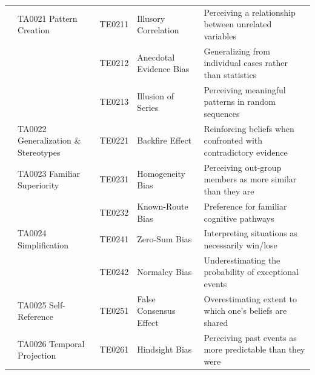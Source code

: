 \documentclass[11pt,a4paper]{article}
\begin{document}
\begin{small}
\begin{longtable}{C{1.2cm}L{3.2cm}C{1.2cm}L{3cm}L{5.5cm}}
\midrule

 & TA0021 Pattern Creation & TE0211 & Illusory Correlation & Perceiving a relationship between unrelated variables \\
 & & TE0212 & Anecdotal Evidence Bias & Generalizing from individual cases rather than statistics \\
 & & TE0213 & Illusion of Series & Perceiving meaningful patterns in random sequences \\
\cmidrule(l){2-5}
 & TA0022 Generalization \& Stereotypes & TE0221 & Backfire Effect & Reinforcing beliefs when confronted with contradictory evidence \\
\cmidrule(l){2-5}
 & TA0023 Familiar Superiority & TE0231 & Homogeneity Bias & Perceiving out-group members as more similar than they are \\
 & & TE0232 & Known-Route Bias & Preference for familiar cognitive pathways \\
\cmidrule(l){2-5}
 & TA0024 Simplification & TE0241 & Zero-Sum Bias & Interpreting situations as necessarily win/lose \\
 & & TE0242 & Normalcy Bias & Underestimating the probability of exceptional events \\
\cmidrule(l){2-5}
 & TA0025 Self-Reference & TE0251 & False Consensus Effect & Overestimating extent to which one's beliefs are shared \\
\cmidrule(l){2-5}
 & TA0026 Temporal Projection & TE0261 & Hindsight Bias & Perceiving past events as more predictable than they were \\

\midrule


\end{longtable}
\end{small}
\end{document}

